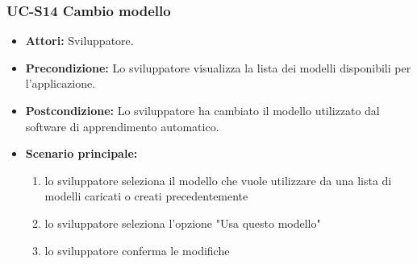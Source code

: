 	\subsubsection{UC-S14 Cambio modello}
	\begin{itemize}					
			\item \textbf{Attori:} Sviluppatore.
			\item \textbf{Precondizione:} Lo sviluppatore visualizza la lista dei modelli disponibili per l'applicazione.
			\item \textbf{Postcondizione:} Lo sviluppatore ha cambiato il modello utilizzato dal software di apprendimento automatico.
			\item \textbf{Scenario principale:}
				\begin{enumerate}
					\item lo sviluppatore seleziona il modello che vuole utilizzare da una lista di modelli caricati o creati precedentemente
					\item lo sviluppatore seleziona l'opzione "Usa questo modello"
					\item lo sviluppatore conferma le modifiche
				\end{enumerate}	
		\end{itemize}		
	